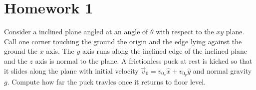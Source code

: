 \documentclass{article}
\begin{document}
\section{Homework 1}

\begin{prb}
Consider a inclined plane angled at an angle of $\theta$ with respect to
the $xy$ plane. Call one corner touching the ground the origin and the
edge lying against the ground the $x$ axis. The $y$ axis runs along the
inclined edge of the inclined plane and the $z$ axis is normal to the
plane. A frictionless puck at rest is kicked so that it slides along the
plane with initial velocity $\vec{v}_0 = v_{0_x} \hat{x} + v_{0_y}
\hat{y}$ and normal gravity $g$. Compute how far the puck travles once
it returns to floor level.
\end{prb}
\end{document}
